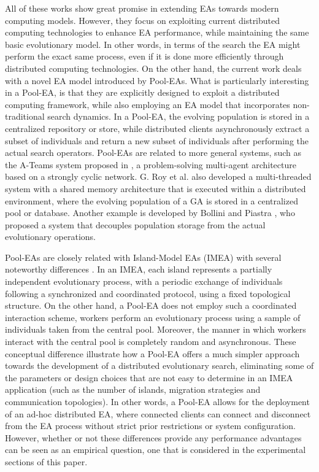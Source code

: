 All of these works show great promise in extending EAs towards modern computing models.
However, they focus on exploiting current distributed computing technologies to enhance EA performance, while maintaining the same basic evolutionary model.
In other words, in terms of the search the EA might perform the exact same process, even if it is done more efficiently through distributed computing technologies.
On the other hand, the current work deals with a novel EA model introduced by Pool-EAs.
What is particularly interesting in a Pool-EA, is that they are explicitly designed to exploit a distributed computing framework, while also employing
an EA model that incorporates non-traditional search dynamics.
In a Pool-EA, the evolving population is stored in a centralized repository or store, while distributed clients asynchronously extract a subset
of individuals and return a new subset of individuals after performing the actual search operators.
Pool-EAs are related to more general systems, such as the A-Teams system proposed in \cite{ateam}, a problem-solving multi-agent architecture based on a strongly cyclic network.
G. Roy et al. \cite{roy:2009} also developed a multi-threaded system with a shared memory architecture
that is executed within a distributed environment, where the evolving population of a GA is stored in a centralized pool or database.
Another example is developed by Bollini and Piastra \cite{bollini:1999}, who proposed a system that decouples population storage from the actual evolutionary operations.

Pool-EAs are closely related with Island-Model EAs (IMEA) \cite{cantu} with several noteworthy differences \cite{PoolvsIsland}.
In an IMEA, each island represents a partially independent evolutionary process, with a periodic exchange of
individuals following a synchronized and coordinated protocol, using a fixed topological structure.
On the other hand, a Pool-EA does not employ such a coordinated interaction scheme, workers perform an evolutionary process
using a sample of individuals taken from the central pool.
Moreover, the manner in which workers interact with the central pool is completely random and asynchronous.
These conceptual difference illustrate how a Pool-EA offers a much simpler approach towards the development of a distributed evolutionary
search, eliminating some of the parameters or design choices that are not easy to determine in an IMEA application
(such as the number of islands, migration strategies and communication topologies).
In other words, a Pool-EA allows for the deployment of an ad-hoc distributed EA, where connected clients can connect and disconnect from the
EA process without strict prior restrictions or system configuration.
However, whether or not these differences provide any performance advantages can be seen as an empirical question, one that is considered
in the experimental sections of this paper.

